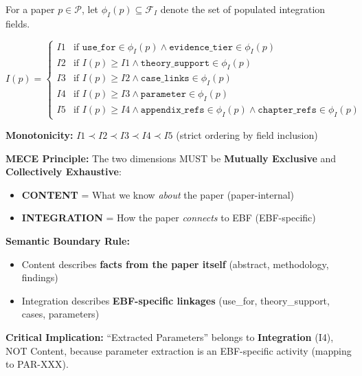 \begin{tcolorbox}[colback=blue!5!white, colframe=blue!75!black,
    title=\textbf{Definition 3: Integration Level Function $I: \mathcal{P} \to \{I1, I2, I3, I4, I5\}$}]

For a paper $p \in \mathcal{P}$, let $\phi_I(p) \subseteq \mathcal{F}_I$ denote the set of populated integration fields.

\begin{equation}
I(p) =
\begin{cases}
I1 & \text{if } \texttt{use\_for} \in \phi_I(p) \land \texttt{evidence\_tier} \in \phi_I(p) \\
I2 & \text{if } I(p) \geq I1 \land \texttt{theory\_support} \in \phi_I(p) \\
I3 & \text{if } I(p) \geq I2 \land \texttt{case\_links} \in \phi_I(p) \\
I4 & \text{if } I(p) \geq I3 \land \texttt{parameter} \in \phi_I(p) \\
I5 & \text{if } I(p) \geq I4 \land \texttt{appendix\_refs} \in \phi_I(p) \land \texttt{chapter\_refs} \in \phi_I(p)
\end{cases}
\end{equation}

\textbf{Monotonicity:} $I1 \prec I2 \prec I3 \prec I4 \prec I5$ (strict ordering by field inclusion)

\end{tcolorbox}

\begin{tcolorbox}[colback=green!5!white, colframe=green!75!black,
    title=\textbf{Axiom MECE-1: Orthogonal Dimension Definition}]

\textbf{MECE Principle:} The two dimensions MUST be \textbf{Mutually Exclusive} and
\textbf{Collectively Exhaustive}:

\begin{itemize}[nosep]
    \item \textbf{CONTENT} = What we know \textit{about} the paper (paper-internal)
    \item \textbf{INTEGRATION} = How the paper \textit{connects} to EBF (EBF-specific)
\end{itemize}

\textbf{Semantic Boundary Rule:}
\begin{itemize}[nosep]
    \item Content describes \textbf{facts from the paper itself} (abstract, methodology, findings)
    \item Integration describes \textbf{EBF-specific linkages} (use\_for, theory\_support, cases, parameters)
\end{itemize}

\textbf{Critical Implication:} ``Extracted Parameters'' belongs to \textbf{Integration} (I4),
NOT Content, because parameter extraction is an EBF-specific activity (mapping to PAR-XXX).

\end{tcolorbox}

